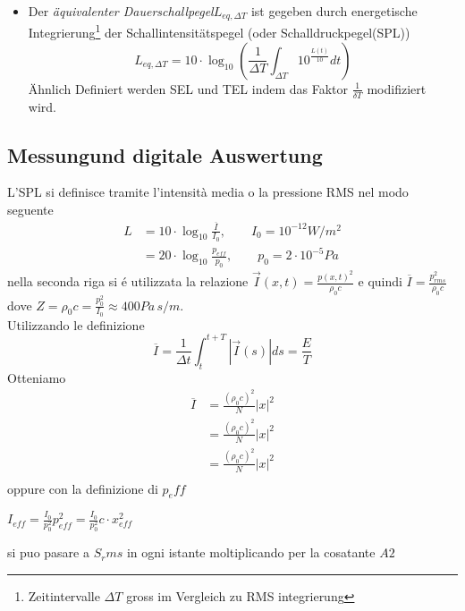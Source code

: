 \documentclass[11pt,a4paper,DIV12,BCOR1.5mm]{scrartcl}
\begin{document}
\begin{itemize}
	\item 
	 Der \emph{äquivalenter Dauerschallpegel}$L_{eq,\Delta T}$ ist gegeben durch energetische Integrierung\footnote{ Zeitintervalle $\Delta T$ gross im Vergleich zu RMS integrierung} der Schallintensitätspegel (oder Schalldruckpegel(SPL))
	\begin{equation}
		L_{eq,\Delta T}=10\cdot\log_{10}\left(\frac{1}{\Delta T}\int_{\Delta T} 10^{\frac{L(t)}{10}} dt \right)
	\end{equation}
	Ähnlich Definiert werden SEL und TEL indem das Faktor $\frac{1}{\delta T}$ modifiziert wird.  
\end{itemize}
	
\newpage
\subsection{Messungund digitale Auswertung}
L'SPL si definisce tramite l'intensità media o la pressione RMS  nel modo seguente
\begin{align}
L&=
10\cdot \log_{10}\frac{\overline{I}}{I_0}, \qquad I_0 = 10^{-12} W/m^2\\
&=20\cdot \log_{10}\frac{p_{eff}}{p_0},\qquad p_0 =2 \cdot 10^{-5} Pa
\end{align}
nella seconda riga si é utilizzata la relazione $\vec I(x,t) =\frac{p(x,t)^2}{\rho_0 c}$ e quindi 
$\overline{I}= \frac{p_{rms}^2}{\rho_0 c}$ dove $Z=\rho_0 c =\frac{p_0^2}{I_0} \approx 400 Pa\,s/m$.\\

Utilizzando le definizione 
\begin{equation}
\overline{I} =\frac{1}{\Delta t}\int_t^{t+T}|\vec{I}(s)|ds =\frac{E}{T}
\end{equation}
Otteniamo
\begin{align}
\overline{I} &=\frac{ (\rho_0 c)^2}{N}|x|^2\\
&=\frac{ (\rho_0 c)^2}{N}|x|^2\\
&=\frac{ (\rho_0 c)^2}{N}|x|^2\\
\end{align}
oppure con la definizione di $p_eff$

$I_{eff} =\frac{I_0}{p_0^2}p_{eff}^2=\frac{I_0}{p_0^2}c\cdot x_{eff}^2$

si puo pasare a $S_rms$ in ogni istante moltiplicando per la cosatante $A2$
\end{document}
